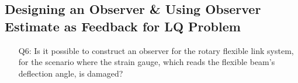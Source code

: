 \documentclass[12pt]{report}
\newcommand\drew[1]{\textcolor{red}{#1}}
\begin{document}
\subsection{Designing an Observer \& Using Observer Estimate as Feedback for LQ Problem}\label{subsection:lab4_observer_lqr}
\begin{enumerate}
    \item[Q6:] Is it possible to construct an observer for the rotary flexible link system, for the scenario where the strain gauge, which reads the flexible beam's deflection angle, is damaged?\\
\end{enumerate}
\end{document}
